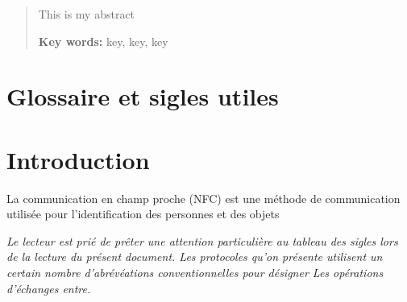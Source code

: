 \documentclass{themeensg}
\begin{document}
\begin{abstract}
\thispagestyle{empty}
	\vspace{1cm}
	
	This is my abstract
	
	\vspace{1.5cm}
	
	\textbf{Key words:} key, key, key
\end{abstract}


\tableofcontents

\newevenpage
\listoffigures

\newevenpage
\listoftables

\chapter*{Glossaire et sigles utiles}

  \begin{acronym}
  \end{acronym}


\newevenpage
\chapter*{Introduction}
  
  \vspace{1.5cm}
  
	La communication en champ proche (NFC) est une méthode de communication utilisée pour l'identification des personnes et des objets



\textit{Le lecteur est prié de prêter une attention particulière au tableau des sigles lors de la lecture du présent document. Les protocoles qu'on présente utilisent un certain nombre d'abrévéations conventionnelles pour désigner Les opérations d'échanges entre. }
\end{document}
